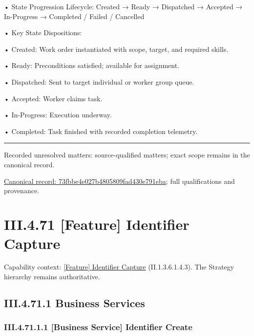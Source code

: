 •
State Progression Lifecycle: Created → Ready → Dispatched → Accepted → In-Progress → Completed / Failed / Cancelled



•
Key State Dispositions:



•
Created: Work order instantiated with scope, target, and required skills.



•
Ready: Preconditions satisfied; available for assignment.



•
Dispatched: Sent to target individual or worker group queue.



•
Accepted: Worker claims task.



•
In-Progress: Execution underway.



•
Completed: Task finished with recorded completion telemetry.



\medskip\hrule\medskip

{\small Recorded unresolved matters: source-qualified matters; exact scope remains in the canonical record.}\par
{\footnotesize \href{../../../../continuum/business/business-process/73fbbe4e027b4805809fad430e791eba.md}{Canonical record: 73fbbe4e027b4805809fad430e791eba}; full qualifications and provenance.}\par
\section*{III.4.71 [Feature] Identifier Capture}
\label{navigation:III.4.71}

{\small Capability context: \hyperref[element:3cae3c4810974c5f8ee5a4c942f38b07]{[Feature] Identifier Capture} (II.1.3.6.1.4.3). The Strategy hierarchy remains authoritative.}\par
\subsection*{III.4.71.1 Business Services}
\label{navigation:III.4.71.1}

\subsubsection*{III.4.71.1.1 [Business Service] Identifier Create}
\label{navigation:III.4.71.1.1}

